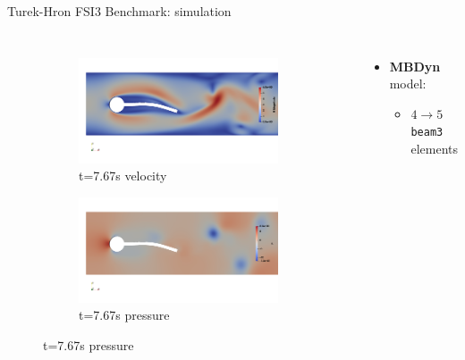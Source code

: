 \documentclass[10pt,t]{beamer}
\begin{document}
\begin{frame}{Turek-Hron FSI3 Benchmark: simulation}
\begin{columns}
\begin{figure}[htb]
\begin{subfigure}{0.5\textwidth}
  \includegraphics[width=\linewidth, trim=0 120 0 120, clip]{images/FSI3/fsi3_v3.png}
  \caption{t=7.67s velocity}
  \label{fig:fsi3_v3}
\end{subfigure}\hfil %
\begin{subfigure}{0.5\textwidth}
  \includegraphics[width=\linewidth, trim=0 120 0 120, clip]{images/FSI3/fsi3_p3.png}
  \caption{t=7.67s pressure}
  \label{fig:fsi3_p3}
\end{subfigure}\hfil %

\label{fig:FSI3_sol}
\end{figure}


\footnotesize
\begin{itemize}
    \itemsep 10pt
    \item \textbf{MBDyn} model:
    \begin{itemize}
        \item $4 \to 5$ \texttt{beam3} elements 
    \end{itemize}
    

\end{itemize}
\end{columns}
\end{frame}
\end{document}

